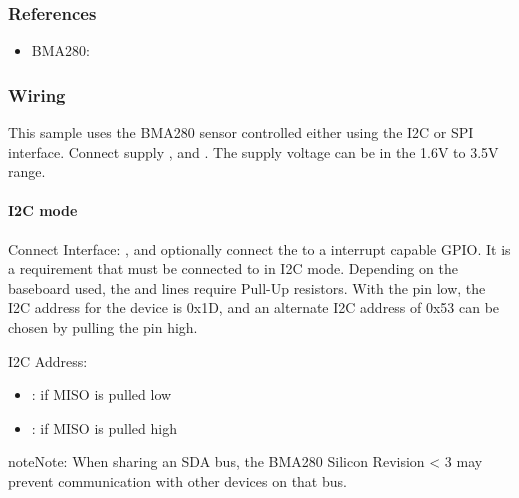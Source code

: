 \documentclass[letterpaper,10pt,english]{sphinxmanual}
\begin{document}
\subsubsection{References}
\label{\detokenize{samples/sensor/bma280/README:references}}\begin{itemize}
\item {} 
BMA280: 

\end{itemize}


\subsubsection{Wiring}
\label{\detokenize{samples/sensor/bma280/README:wiring}}
This sample uses the BMA280 sensor controlled either using the I2C or SPI interface.
Connect supply ,  and . The supply voltage can be in
the 1.6V to 3.5V range.


\paragraph{I2C mode}
\label{\detokenize{samples/sensor/bma280/README:i2c-mode}}
Connect Interface: ,  and optionally connect the  to a
interrupt capable GPIO. It is a requirement that  must be connected to
 in I2C mode. Depending on the baseboard used, the  and 
lines require Pull-Up resistors. With the  pin low, the I2C address for
the device is 0x1D, and an alternate I2C address of 0x53 can be chosen by
pulling the  pin high.

I2C Address:
\begin{itemize}
\item {} 
: if MISO is pulled low

\item {} 
: if MISO is pulled high

\end{itemize}

\begin{sphinxadmonition}{note}{Note:}
When sharing an SDA bus, the BMA280 Silicon Revision \textless{} 3  may prevent
communication with other devices on that bus.
\end{sphinxadmonition}
\end{document}
